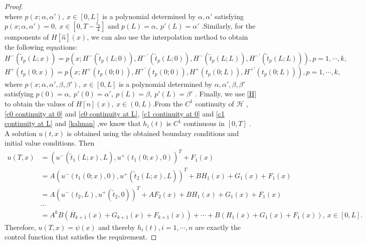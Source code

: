 \documentclass[a4paper,reqno,11pt]{amsart}
\numberwithin{equation}{section} %
\begin{document}
\begin{proof}
\begin{equation}
\end{equation}
where $p(x;\alpha ,\alpha  ') ,\ x \in [0,L]$ is a polynomial determined by $\alpha ,\alpha  '$ satisfying $p(x;\alpha ,\alpha  ') =0, \  x \in [0,T-\frac{t_0}{4}]$ and $p(L)=\alpha ,\ p'(L)=\alpha  '$ .Similarly, for the components of $H\left[ \hat{n} \right] \left( x \right)$, we can also use the interpolation method to obtain the following equations:
\begin{equation}\label{polynomial p r}
	H^-\left( \tilde{t}_p\left( L;x \right) \right) =p\left( x;H^-\left( \tilde{t}_p\left( L;0 \right) \right) ,H^{- \prime}\left( \tilde{t}_p\left( L;0 \right) \right) ,H^-\left( \tilde{t}_p\left( L;L \right) \right) ,H^{- \prime}\left( \tilde{t}_p\left( L;L \right) \right) \right) ,p=1,\cdots,k,
\end{equation}
\begin{equation}\label{polynomial p s}
	H^+\left( t_p\left( 0;x \right) \right) =p\left( x;H^+\left( t_p\left( 0;0 \right) \right) ,H^{+ \prime}\left( t_p\left( 0;0 \right) \right) ,H^+\left( t_p\left( 0;L \right) \right) ,H^{+ \prime}\left( t_p\left( 0;L \right) \right) \right) ,p=1,\cdots,k,
\end{equation}
where $p(x;\alpha ,\alpha  ',\beta ,\beta  ') ,\ x \in [0,L]$ is a polynomial determined by $\alpha ,\alpha  ',\beta ,\beta  '$ satisfying $p(0)=\alpha ,\ p'(0)=\alpha  ',\ p(L)=\beta ,\ p'(L)=\beta  '$ . Finally, we use \eqref{H} to obtain the values of $H\left[ n \right] \left( x \right),\  x \in (0,L)$.From the $C^1$ continuity of $\mathcal{H}$ , \eqref{c0 continuity at 0} and \eqref{c0 continuity at L}, \eqref{c1 continuity at 0} and \eqref{c1 continuity at L} and \eqref{kalman} ,we know that $h_i(t)$ is $C^1$ continuous in $[0,T]$ .
A solution $u(t,x)$ is obtained using the obtained boundary conditions and initial value conditions. Then
\begin{equation}
	\begin{aligned}
		u(T,x)				   &=(u^- (\tilde{t} _1(L;x) ,L) ,u^+ (t _1(0;x),0))^T + F_1(x)\\
							   &=A(u^- (t _1(0;x) ,0) ,u^+ (\tilde{t} _2 (L;x),L))^T + BH_1(x)+G_1(x)+F_1(x)\\
							   &=A(u^- (t _2 ,L) ,u^+ (\tilde{t} _2 ,0))^T +AF_2(x)+ BH_1(x)+G_1(x)+F_1(x)\\
							   & \cdots \\
							   &=A^kB(H_{k+1}\left( x \right)+G_{k+1}\left( x \right)+F_{k+1}\left( x \right)) +\cdots  +B(H_1\left( x \right)+G_1\left( x \right)+F_1\left( x \right)) ,\ x\in \left[ 0,L \right].
	\end{aligned}
\end{equation}
Therefore, $u(T,x)=\psi(x)$ and thereby $h_i(t),i=1,\cdots,n$ are exactly the control function that satisfies the requirement.
\end{proof}
\end{document}
